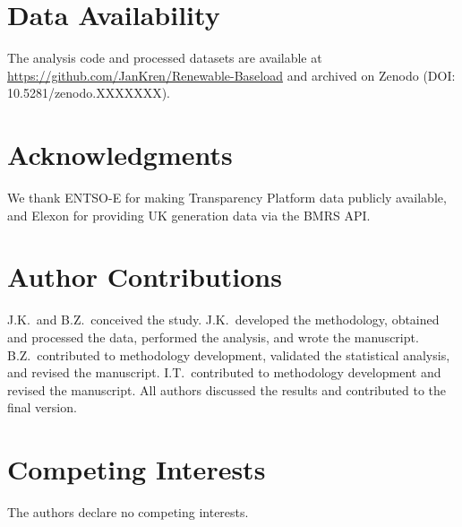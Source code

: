 \documentclass{article}
\begin{document}
\section*{Data Availability}

The analysis code and processed datasets are available at \url{https://github.com/JanKren/Renewable-Baseload} and archived on Zenodo (DOI: 10.5281/zenodo.XXXXXXX). %


\section*{Acknowledgments}

We thank ENTSO-E for making Transparency Platform data publicly available, and Elexon for providing UK generation data via the BMRS API.


\section*{Author Contributions}

J.K.\ and B.Z.\ conceived the study. J.K.\ developed the methodology, obtained and processed the data, performed the analysis, and wrote the manuscript. B.Z.\ contributed to methodology development, validated the statistical analysis, and revised the manuscript. I.T.\ contributed to methodology development and revised the manuscript. All authors discussed the results and contributed to the final version.


\section*{Competing Interests}

The authors declare no competing interests.
\end{document}
